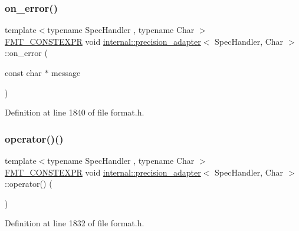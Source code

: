 \subsubsection{\texorpdfstring{on\+\_\+error()}{on\_error()}}
{\footnotesize\ttfamily template$<$typename Spec\+Handler , typename Char $>$ \\
\hyperlink{core_8h_a69201cb276383873487bf68b4ef8b4cd}{F\+M\+T\+\_\+\+C\+O\+N\+S\+T\+E\+X\+PR} void \hyperlink{structinternal_1_1precision__adapter}{internal\+::precision\+\_\+adapter}$<$ Spec\+Handler, Char $>$\+::on\+\_\+error (\begin{DoxyParamCaption}\item[{const char $\ast$}]{message }\end{DoxyParamCaption})\hspace{0.3cm}{\ttfamily [inline]}}



Definition at line 1840 of file format.\+h.

\mbox{\label{structinternal_1_1precision__adapter_a63c4faa71c1b6bfa1555baa09a4669c7}} 
\subsubsection{\texorpdfstring{operator()()}{operator()()}\hspace{0.1cm}{\footnotesize\ttfamily [1/3]}}
{\footnotesize\ttfamily template$<$typename Spec\+Handler , typename Char $>$ \\
\hyperlink{core_8h_a69201cb276383873487bf68b4ef8b4cd}{F\+M\+T\+\_\+\+C\+O\+N\+S\+T\+E\+X\+PR} void \hyperlink{structinternal_1_1precision__adapter}{internal\+::precision\+\_\+adapter}$<$ Spec\+Handler, Char $>$\+::operator() (\begin{DoxyParamCaption}{ }\end{DoxyParamCaption})\hspace{0.3cm}{\ttfamily [inline]}}



Definition at line 1832 of file format.\+h.

\mbox{\label{structinternal_1_1precision__adapter_a6c0c03e7be98384394ab50d55fcbed42}} 
